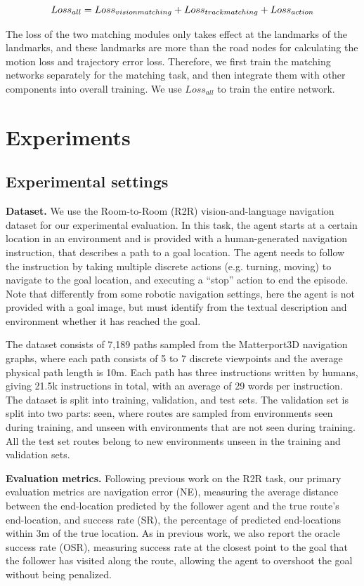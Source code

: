 \begin{equation}
	\centering
	{Loss}_{all} = {Loss}_{vision matching} + {Loss}_{track matching} + {Loss}_{action}
\end{equation}

The loss of the two matching modules only takes effect at the landmarks of the landmarks, and these landmarks are more than the road nodes for calculating the motion loss and trajectory error loss. Therefore, we first train the matching networks separately for the matching task, and then integrate them with other components into overall training. We use ${Loss}_{all}$ to train the entire network.

\section{Experiments}
	
\subsection{Experimental settings}
	
\textbf{Dataset.} We use the Room-to-Room (R2R) vision-and-language navigation dataset for our experimental evaluation. In this task, the agent starts at a certain location in an environment and is provided with a human-generated navigation instruction, that describes a path to a goal location. The agent needs to follow the instruction by taking multiple discrete actions (e.g. turning, moving) to navigate to the goal location, and executing a “stop” action to end the episode. Note that differently from some robotic navigation settings, here the agent is not provided with a goal image, but must identify from the textual description and environment whether it has reached the goal.
	
The dataset consists of 7,189 paths sampled from the Matterport3D navigation graphs, where each path consists of 5 to 7 discrete viewpoints and the average physical path length is 10m. Each path has three instructions written by humans, giving 21.5k instructions in total, with an average of 29 words per instruction. The dataset is split into training, validation, and test sets. The validation set is split into two parts: seen, where routes are sampled from environments seen during training, and unseen with environments that are not seen during training. All the test set routes belong to new environments unseen in the training and validation sets.

\textbf{Evaluation metrics.} Following previous work on the R2R task, our primary evaluation metrics are navigation error (NE), measuring the average distance between the end-location predicted by the follower agent and the true route’s end-location, and success rate (SR), the percentage of predicted end-locations within 3m of the true location. As in previous work, we also report the oracle success rate (OSR), measuring success rate at the closest point to the goal that the follower has visited along the route, allowing the agent to overshoot the goal without being penalized.


